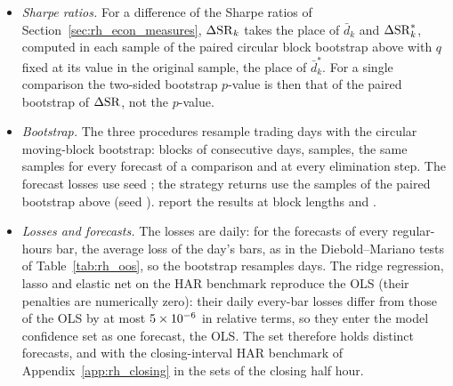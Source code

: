 \begin{itemize}
\begin{itemize}
    we report the bootstrap $p$-value of the comparison alone, $\Pr^{*}(Z^{*}_k \ge t_k)$.
  \item \emph{Sharpe ratios.} For a difference of the Sharpe ratios of Section~\ref{sec:rh_econ_measures},
    $\Delta\mathrm{SR}_k$ takes the place of $\bar d_k$ and $\Delta\mathrm{SR}^{*}_k$, computed in each sample of the paired circular
    block bootstrap above with $q$ fixed at its value in the original sample, the place of $\bar d^{*}_k$. For a single
    comparison the two-sided bootstrap $p$-value is then that of the paired bootstrap of $\Delta\mathrm{SR}$, not the
    \citet{LedoitWolf2008} $p$-value.
  \item \emph{Bootstrap.} The three procedures resample trading days with the circular moving-block bootstrap: blocks
    of \rhmcsBlock{} consecutive days, \rhmcsB{} samples, the same samples for every forecast of a comparison and at
    every elimination step. The forecast losses use seed \rhmcsSeed; the strategy returns use the samples of the
    paired bootstrap above (seed \rhmcsSeedEcon).
    report the results at block lengths \rhmcsBlockLo{} and \rhmcsBlockHi.
  \item \emph{Losses and forecasts.} The losses are daily: for the forecasts of every regular-hours bar, the average
    loss of the day's \rhorNBars{} bars, as in the Diebold--Mariano tests of Table~\ref{tab:rh_oos}, so the bootstrap
    resamples days. The ridge regression, lasso and elastic net on the HAR benchmark reproduce the OLS
    (their penalties are numerically zero): their daily every-bar losses differ from those of the OLS by at most
    $5 \times 10^{-6}$ in relative terms, so they enter the model confidence set as one forecast, the OLS. The set
    therefore holds \rhmcsNModelsWord{} distinct forecasts, and \rhmcsNModelsBenchWord{} with the
    closing-interval HAR benchmark of Appendix~\ref{app:rh_closing} in the sets of the closing half hour.

\end{itemize}
\end{itemize}
